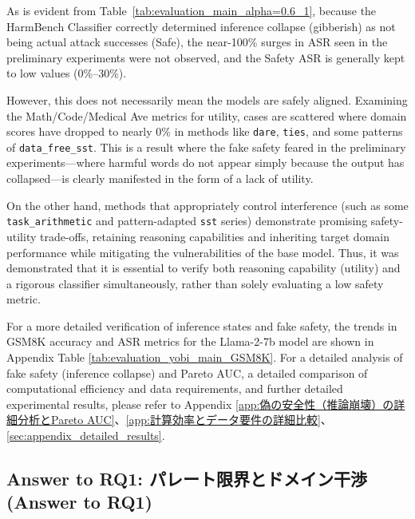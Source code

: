 \documentclass{article}
\begin{document}
As is evident from Table~\ref{tab:evaluation_main_alpha=0.6_1}, because the HarmBench Classifier correctly determined inference collapse (gibberish) as not being actual attack successes (Safe), the near-100\% surges in ASR seen in the preliminary experiments were not observed, and the Safety ASR is generally kept to low values (0\%--30\%).

However, this does not necessarily mean the models are safely aligned. Examining the Math/Code/Medical Ave metrics for utility, cases are scattered where domain scores have dropped to nearly 0\% in methods like \texttt{dare}, \texttt{ties}, and some patterns of \texttt{data\_free\_sst}. This is a result where the fake safety feared in the preliminary experiments---where harmful words do not appear simply because the output has collapsed---is clearly manifested in the form of a lack of utility.

On the other hand, methods that appropriately control interference (such as some \texttt{task\_arithmetic} and pattern-adapted \texttt{sst} series) demonstrate promising safety-utility trade-offs, retaining reasoning capabilities and inheriting target domain performance while mitigating the vulnerabilities of the base model. Thus, it was demonstrated that it is essential to verify both reasoning capability (utility) and a rigorous classifier simultaneously, rather than solely evaluating a low safety metric.

For a more detailed verification of inference states and fake safety, the trends in GSM8K accuracy and ASR metrics for the Llama-2-7b model are shown in Appendix Table \ref{tab:evaluation_yobi_main_GSM8K}. For a detailed analysis of fake safety (inference collapse) and Pareto AUC, a detailed comparison of computational efficiency and data requirements, and further detailed experimental results, please refer to Appendix \ref{app:偽の安全性（推論崩壊）の詳細分析とPareto AUC}、\ref{app:計算効率とデータ要件の詳細比較}、\ref{sec:appendix_detailed_results}.

\subsection{Answer to RQ1: パレート限界とドメイン干渉 (Answer to RQ1)}
\end{document}
